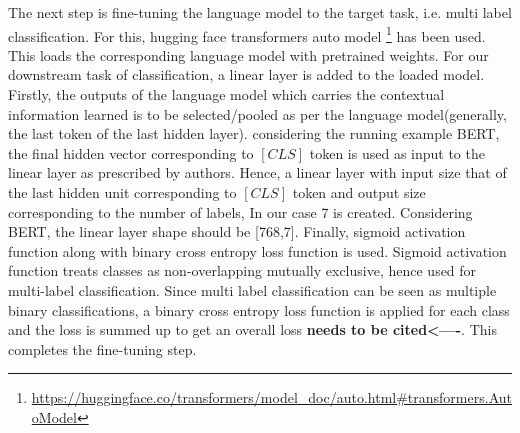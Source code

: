 The next step is fine-tuning the language model to the target task, i.e. multi label classification. For this, hugging face transformers auto model \footnote{\url{https://huggingface.co/transformers/model_doc/auto.html#transformers.AutoModel}} has been used. This loads the corresponding language model with pretrained weights. For our downstream task of classification, a linear layer is added to the loaded model. Firstly, the outputs of the language model which carries the contextual information learned is to be selected/pooled as per the language model(generally, the last token of the last hidden layer). considering the running example BERT, the final hidden vector corresponding to $[CLS]$ token is used as input to the linear layer as prescribed by authors\cite{devlin2018bert}. Hence, a linear layer with input size that of the last hidden unit corresponding to $[CLS]$ token and output size corresponding to the number of labels, In our case 7 is created. Considering BERT, the linear layer shape should be [768,7].  Finally, sigmoid activation function along with binary cross entropy loss function is used. Sigmoid activation function treats classes as non-overlapping mutually exclusive, hence used for multi-label classification. Since multi label classification can be seen as multiple binary classifications, a binary cross entropy loss function is applied for each class and the loss is summed up to get an overall loss \textbf{needs to be cited<----}. This completes the fine-tuning step.

